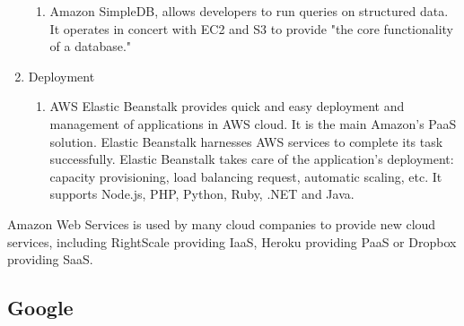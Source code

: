 \begin{enumerate}
\begin{enumerate}
\item Amazon SimpleDB, allows developers to run queries on structured data. It operates in concert with EC2 and S3 to provide "the core functionality of a database."
\end{enumerate}
\item Deployment
\begin{enumerate}
\item AWS Elastic Beanstalk provides quick and easy deployment and management of applications in AWS cloud. It is the main Amazon's PaaS solution. Elastic Beanstalk harnesses AWS services to complete its task successfully. Elastic Beanstalk takes care of the application's deployment: capacity provisioning, load balancing request, automatic scaling, etc. It supports Node.js, PHP, Python, Ruby, .NET and Java. 
\end{enumerate}
\end{enumerate}

Amazon Web Services is used by many cloud companies to provide new cloud services, including RightScale providing IaaS, Heroku providing PaaS or Dropbox providing SaaS.

\subsection{Google}

